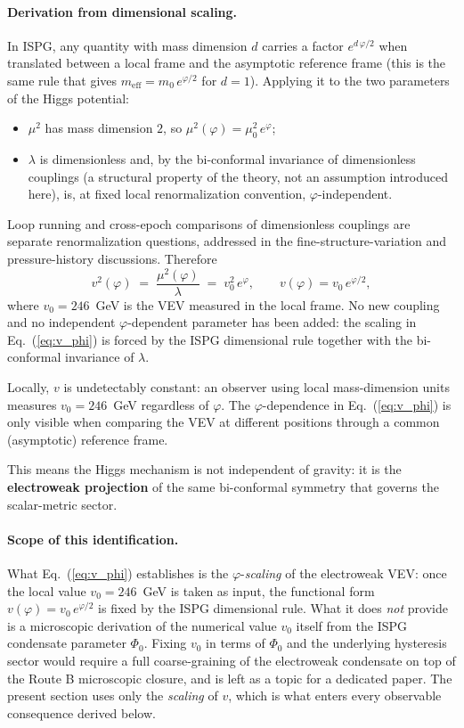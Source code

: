 \documentclass[aps,prd,onecolumn,superscriptaddress,nofootinbib,showpacs,12pt,notitlepage]{revtex4-2}
\newcommand{\meff}{m_{\mathrm{eff}}}
\begin{document}
\paragraph{Derivation from dimensional scaling.}
In ISPG, any quantity with mass dimension $d$ carries
a factor $e^{d\,\varphi/2}$ when translated between a
local frame and the asymptotic reference frame (this is
the same rule that gives $\meff = m_0\,e^{\varphi/2}$ for
$d=1$).  Applying it to the two parameters of the Higgs
potential:
\begin{itemize}
  \item $\mu^{2}$ has mass dimension $2$, so
    $\mu^{2}(\varphi) = \mu_0^{2}\,e^{\varphi}$;
  \item $\lambda$ is dimensionless and, by the
    bi-conformal invariance of dimensionless couplings
    (a structural property of the theory, not an
    assumption introduced here), is, at fixed local
    renormalization convention,
    $\varphi$-independent.
\end{itemize}
Loop running and cross-epoch comparisons of
dimensionless couplings are separate renormalization
questions, addressed in the fine-structure-variation and
pressure-history discussions.
Therefore
\begin{equation}\label{eq:v_phi}
  \boxed{
  v^{2}(\varphi) \;=\; \frac{\mu^{2}(\varphi)}{\lambda}
  \;=\; v_0^{2}\,e^{\varphi},
  \qquad
  v(\varphi) = v_0\,e^{\varphi/2},
  }
\end{equation}
where $v_0 = 246$~GeV is the VEV measured in the local
frame.  No new coupling and no independent
$\varphi$-dependent parameter has been added: the
scaling in Eq.~(\ref{eq:v_phi}) is forced by the ISPG
dimensional rule together with the bi-conformal
invariance of $\lambda$.

Locally, $v$ is undetectably constant: an observer
using local mass-dimension units measures $v_0 = 246$~GeV
regardless of $\varphi$.  The $\varphi$-dependence in
Eq.~(\ref{eq:v_phi}) is only visible when comparing the
VEV at different positions through a common (asymptotic)
reference frame.

This means the Higgs mechanism is not independent of
gravity: it is the \textbf{electroweak projection} of the
same bi-conformal symmetry that governs the
scalar-metric sector.

\paragraph{Scope of this identification.}
What Eq.~(\ref{eq:v_phi}) establishes is the
$\varphi$-\emph{scaling} of the electroweak VEV: once
the local value $v_0 = 246$~GeV is taken as input, the
functional form $v(\varphi) = v_0\,e^{\varphi/2}$ is
fixed by the ISPG dimensional rule.  What it does
\emph{not} provide is a microscopic derivation of the
numerical value $v_0$ itself from the ISPG condensate
parameter $\Phi_0$.  Fixing $v_0$ in terms of
$\Phi_0$ and the underlying hysteresis sector would
require a full coarse-graining of the electroweak
condensate on top of the Route B microscopic closure,
and is left as a topic for a dedicated paper.  The
present section uses only the \emph{scaling} of $v$,
which is what enters every observable consequence
derived below.
\end{document}
